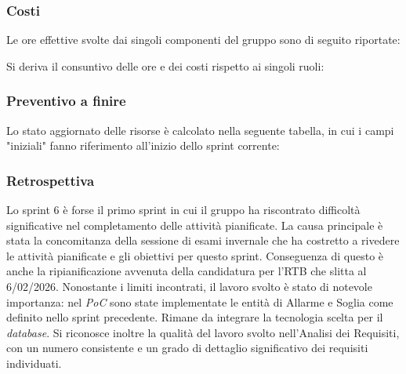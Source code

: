 \documentclass[10pt, letterpaper]{article}
\begin{document}
\subsubsection{Costi}
Le ore effettive svolte dai singoli componenti del gruppo sono di seguito riportate:

\setRuoloFilippo{\Progr}
\setRuoloChristian{\Amm}
\setRuoloValeria{\Resp}
\setRuoloGiuseppe{\Progr}
\setRuoloFrancesco{\Amm}
\setRuoloLuca{\Verif}
\setRuoloLeonardo{\Anal}



Si deriva il consuntivo delle ore e dei costi rispetto ai singoli ruoli:


\subsubsection{Preventivo a finire}
Lo stato aggiornato delle risorse è calcolato nella seguente tabella, in cui i campi "iniziali" fanno riferimento all'inizio dello sprint corrente:



\subsubsection{Retrospettiva}
Lo sprint 6 è forse il primo sprint in cui il gruppo ha riscontrato difficoltà significative nel completamento delle attività pianificate.
La causa principale è stata la concomitanza della sessione di esami invernale che ha costretto a rivedere le attività pianificate e gli obiettivi per questo sprint.
Conseguenza di questo è anche la ripianificazione avvenuta della candidatura per l'RTB che slitta al 6/02/2026.
Nonostante i limiti incontrati, il lavoro svolto è stato di notevole importanza: nel \textit{PoC} sono state implementate le entità di Allarme e Soglia come definito nello sprint precedente. Rimane da integrare la tecnologia scelta per il \textit{database}.
Si riconosce inoltre la qualità del lavoro svolto nell'Analisi dei Requisiti, con un numero consistente e un grado di dettaglio significativo dei requisiti individuati.
\end{document}
